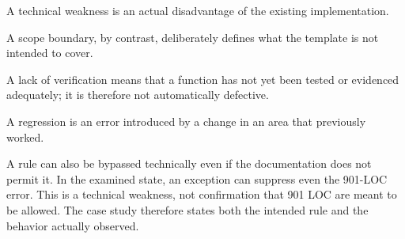 \begin{beginnerstatement}

A technical weakness is an actual disadvantage of the existing
implementation.

A scope boundary, by contrast, deliberately defines what the template is not
intended to cover.

A lack of verification means that a function has not yet been tested or
evidenced adequately; it is therefore not automatically defective.

A regression is an error introduced by a change in an area that previously
worked.

A rule can also be bypassed technically even if the documentation does not
permit it. In the examined state, an exception can suppress even the 901-LOC
error. This is a technical weakness, not confirmation that 901 LOC are meant
to be allowed. The case study therefore states both the intended rule and the
behavior actually observed.

\end{beginnerstatement}
